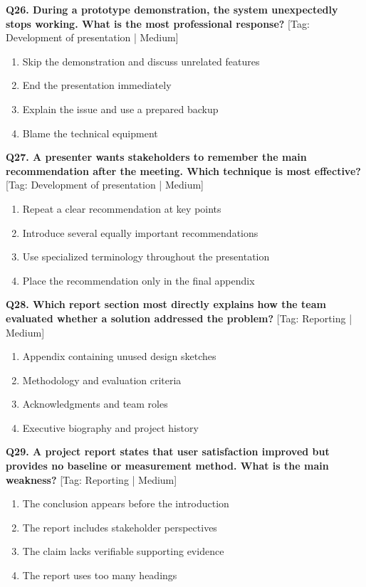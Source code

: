 \noindent\textbf{Q26. During a prototype demonstration, the system unexpectedly stops working. What is the most professional response?} \hfill [Tag: Development of presentation | Medium]
\begin{enumerate}[label=(\alph*),topsep=2pt,itemsep=1pt,partopsep=0pt,parsep=0pt]
    \item {Skip the demonstration and discuss unrelated features}
    \item {End the presentation immediately}
    \item {Explain the issue and use a prepared backup}
    \item {Blame the technical equipment}
\end{enumerate}
\vspace{2mm}

\noindent\textbf{Q27. A presenter wants stakeholders to remember the main recommendation after the meeting. Which technique is most effective?} \hfill [Tag: Development of presentation | Medium]
\begin{enumerate}[label=(\alph*),topsep=2pt,itemsep=1pt,partopsep=0pt,parsep=0pt]
    \item {Repeat a clear recommendation at key points}
    \item {Introduce several equally important recommendations}
    \item {Use specialized terminology throughout the presentation}
    \item {Place the recommendation only in the final appendix}
\end{enumerate}
\vspace{2mm}

\noindent\textbf{Q28. Which report section most directly explains how the team evaluated whether a solution addressed the problem?} \hfill [Tag: Reporting | Medium]
\begin{enumerate}[label=(\alph*),topsep=2pt,itemsep=1pt,partopsep=0pt,parsep=0pt]
    \item {Appendix containing unused design sketches}
    \item {Methodology and evaluation criteria}
    \item {Acknowledgments and team roles}
    \item {Executive biography and project history}
\end{enumerate}
\vspace{2mm}

\noindent\textbf{Q29. A project report states that user satisfaction improved but provides no baseline or measurement method. What is the main weakness?} \hfill [Tag: Reporting | Medium]
\begin{enumerate}[label=(\alph*),topsep=2pt,itemsep=1pt,partopsep=0pt,parsep=0pt]
    \item {The conclusion appears before the introduction}
    \item {The report includes stakeholder perspectives}
    \item {The claim lacks verifiable supporting evidence}
    \item {The report uses too many headings}
\end{enumerate}
\vspace{2mm}

